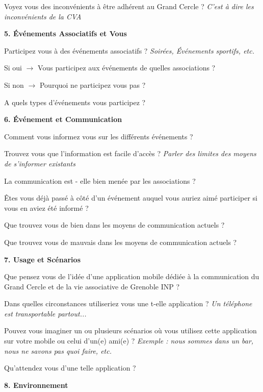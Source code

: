 \documentclass[a4paper, 11px]{article}
\begin{document}
Voyez vous des inconvénients à être adhérent au Grand Cercle ?
\textit{C'est à dire les inconvénients de la CVA}


\vspace{.2cm}
 \textbf {\large 5. Événements Associatifs et Vous}

Participez vous à des événements associatifs ?
\textit{Soirées, Événements sportifs, etc.}

Si oui $\rightarrow$ Vous participez aux événements de quelles associations ?

Si non $\rightarrow$ Pourquoi ne participez vous pas ?

A quels types d'événements vous participez ?


\vspace{.3cm}

 \textbf {\large 6. Événement et Communication}

Comment vous informez vous sur les différents événements ?

Trouvez vous que l'information est facile d'accès ?
\textit{Parler des limites des moyens de s'informer existants}


La communication est - elle bien menée par les associations ?

Êtes vous déjà passé à côté d'un événement auquel vous auriez aimé participer si vous en aviez été informé ?

Que trouvez vous de bien dans les moyens de communication actuels ?


Que trouvez vous de mauvais dans les moyens de communication actuels ?


\vspace{.3cm}

 \textbf {\large 7. Usage et Scénarios}

Que pensez vous de l'idée d'une application mobile dédiée à la communication du Grand Cercle et de la vie associative de Grenoble INP ?


Dans quelles circonstances utiliseriez vous une t-elle application ?
\textit{Un téléphone est transportable partout...}


Pouvez vous imaginer un ou plusieurs scénarios où vous utilisez cette application sur votre mobile ou celui d'un(e) ami(e) ?
\textit{Exemple : nous sommes dans un bar, nous ne savons pas quoi faire, etc.}

Qu'attendez vous d'une telle application ?


\vspace{.3cm}

 \textbf {\large 8. Environnement}
\end{document}
